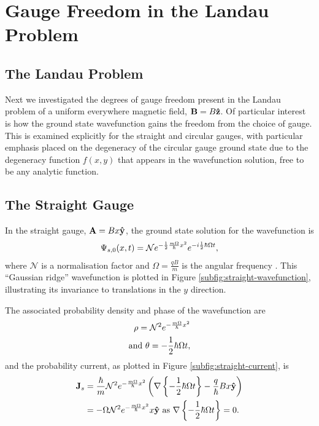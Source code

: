 \section{Gauge Freedom in the Landau Problem}
\label{sec:landau}

\subsection{The Landau Problem}

Next we investigated the degrees of gauge freedom present in the Landau problem
of a uniform everywhere magnetic field, $\mathbf{B} = B \mathbf{\hat z }$. Of
particular interest is how the ground state wavefunction gains the freedom from
the choice of gauge. This is examined explicitly for the straight and circular
gauges, with particular emphasis placed on the degeneracy of the circular gauge
ground state due to the degeneracy function $f(x,y)$ that appears in the
wavefunction solution, free to be any analytic function.

\subsection{The Straight Gauge}

In the straight gauge, $\mathbf{A} = Bx\mathbf{\hat y }$, the ground state solution for
the wavefunction is
\begin{align}
    \Psi_{s,0}(x,t) = \mathcal{N} e^{- \frac{1}{2} \frac{m \Omega}{\hbar} x^2} e^{-i \frac{1}{2}
        \hbar \Omega t},
\end{align}
where $\mathcal{N}$ is a normalisation factor and $\Omega = \frac{qB}{m}$ is the
angular frequency \cite{murayama}. This ``Gaussian ridge''
wavefunction is plotted in Figure \ref{subfig:straight-wavefunction},
illustrating its invariance to translations in the $y$ direction.

The associated probability density and phase of the wavefunction are
\begin{align}
    \rho = \mathcal{N}^2 e^{- \frac{m \Omega}{\hbar} x^2} \\
    \mathrm{and}~ \theta = - \frac{1}{2} \hbar \Omega t,
\end{align}
and the probability current, as plotted in Figure \ref{subfig:straight-current},
is
\begin{align}
    \mathbf{J}_s &= \frac{\hbar}{m} \mathcal{N}^2 e^{- \frac{m \Omega}{\hbar} x^2} \left(
        \nabla \left\{ -\frac{1}{2} \hbar \Omega t \right\} - \frac{q}{\hbar} B
        x \mathbf{\hat y } \right) \\
    &= - \Omega \mathcal{N}^2 e^{- \frac{m \Omega}{\hbar} x^2} x\mathbf{\hat y } ~\mathrm{as}~
        \nabla \left\{ -\frac{1}{2} \hbar \Omega t \right\} = 0.
\end{align}

